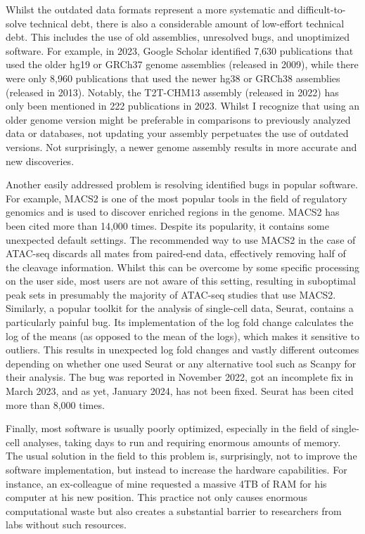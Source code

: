 Whilst the outdated data formats represent a more systematic and difficult-to-solve technical debt, there is also a considerable amount of low-effort technical debt. This includes the use of old assemblies, unresolved bugs, and unoptimized software. For example, in 2023, Google Scholar identified 7,630 publications that used the older hg19 or GRCh37 genome assemblies (released in 2009), while there were only 8,960 publications that used the newer hg38 or GRCh38 assemblies (released in 2013). Notably, the T2T-CHM13 assembly (released in 2022) has only been mentioned in 222 publications in 2023. Whilst I recognize that using an older genome version might be preferable in comparisons to previously analyzed data or databases, not updating your assembly perpetuates the use of outdated versions. Not surprisingly, a newer genome assembly results in more accurate and new discoveries\cite{Aganezov2022,Pan2019}. 

Another easily addressed problem is resolving identified bugs in popular software. For example, MACS2 is one of the most popular tools in the field of regulatory genomics and is used to discover enriched regions in the genome. MACS2 has been cited more than 14,000 times\cite{Zhang2008}. Despite its popularity, it contains some unexpected default settings. The recommended way to use MACS2 in the case of ATAC-seq discards all mates from paired-end data, effectively removing half of the cleavage information\cite{Gaspar2018}. Whilst this can be overcome by some specific processing on the user side, most users are not aware of this setting, resulting in suboptimal peak sets in presumably the majority of ATAC-seq studies that use MACS2. Similarly, a popular toolkit for the analysis of single-cell data, Seurat, contains a particularly painful bug. Its implementation of the log fold change calculates the log of the means (as opposed to the mean of the logs), which makes it sensitive to outliers. This results in unexpected log fold changes and vastly different outcomes depending on whether one used Seurat or any alternative tool such as Scanpy for their analysis. The bug was reported in November 2022, got an incomplete fix in March 2023, and as yet, January 2024, has not been fixed\cite{WatsonHaigh}. Seurat has been cited more than 8,000 times. 

Finally, most software is usually poorly optimized, especially in the field of single-cell analyses, taking days to run and requiring enormous amounts of memory\cite{Pratapa_2020}. The usual solution in the field to this problem is, surprisingly, not to improve the software implementation, but instead to increase the hardware capabilities. For instance, an ex-colleague of mine requested a massive 4TB of RAM for his computer at his new position. This practice not only causes enormous computational waste but also creates a substantial barrier to researchers from labs without such resources.


